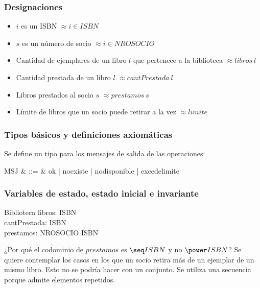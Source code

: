 \documentclass{article}
\begin{document}
\subsubsection*{Designaciones}
\begin{itemize}
\item[] $i$ es un ISBN $\approx i \in ISBN$
\item[] $s$ es un número de socio $\approx i \in NROSOCIO$
\item[] Cantidad de ejemplares de un libro $l$ que pertenece a la biblioteca $\approx libros~l$
\item[] Cantidad prestada de un libro $l$ $\approx cantPrestada~l$
\item[] Libros prestados al socio $s$ $\approx prestamos~s$
\item[] Límite de libros que un socio puede retirar a la vez $\approx limite$
\end{itemize}

\subsubsection*{Tipos básicos y definiciones axiomáticas}
\begin{zed}
\end{zed}

Se define un tipo para los mensajes de salida de las operaciones:
\begin{syntax}
MSJ & ::= & ok | noexiste | nodisponible | excedelimite
\end{syntax}


\subsubsection*{Variables de estado, estado inicial e invariante}

\begin{schema}{Biblioteca}
libros: ISBN \pfun \nat \\
cantPrestada: ISBN \pfun \nat \\
prestamos: NROSOCIO \pfun \seq ISBN
\end{schema}

¿Por qué el codominio de $prestamos$ es $\seq ISBN$ y no $\power ISBN$? Se quiere contemplar los casos en los que un socio retira más de un ejemplar de un mismo libro. Esto no se podría hacer con un conjunto. Se utiliza una secuencia porque admite elementos repetidos.
\end{document}
